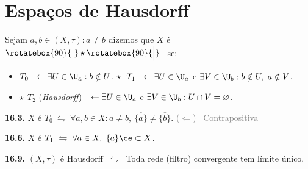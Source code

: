 \section{Espaços de Hausdorff}

\begin{definition}
    Sejam \(a, b \in (X,\tau) : a \neq b\) dizemos que \(X\) é  \ \(\rotatebox{90}{\Big|} \star \rotatebox{90}{\Big|} \) \ se:%
    \vspace{-0.3cm}
    \begin{itemize}[label = \(\star\), left = 1cm]
        \item \(T_0 \ \ \leftarrow \exists U \in \U_a : b \notin U\). \hfill \(\star \ \ T_1 \ \ \leftarrow \exists U \in \U_a\) e \(\exists V \in \U_b : b \notin U, \ a \notin V\).
        \item[]\hspace{1.8cm} \(\star \ \ T_2\) (\emph{Hausdorff}) \(\ \ \leftarrow \exists U \in \U_a\) e \(\exists V \in \U_b : U\cap V = \varnothing\).
    \end{itemize}
\end{definition}


\begin{proposition}
    \textbf{16.3.} \(X\) é \(T_0 \ \leftrightharpoons \ \forall a,b \in X : a \neq b, \ \overline{\{a\}}\neq \overline{\{b\}}\).  \textcolor{gray}{(\(\Leftarrow\)) \ Contrapositiva}
\end{proposition}

\begin{proposition}
    \textbf{16.6.} \(X\) é \(T_1 \ \leftrightharpoons \ \forall a \in X, \ \{a\}\ce \subset X\).  
\end{proposition}

\begin{proposition}
    \textbf{16.9.} \((X, \tau)\) é Hausdorff \(\ \leftrightharpoons \ \) Toda rede (filtro) convergente tem  límite único. 
\end{proposition}

